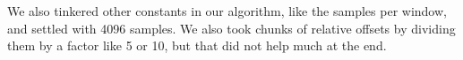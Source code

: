 \documentclass[12pt, a4paper]{IEEEtran}
\begin{document}
\par
We also tinkered other constants in our algorithm, like the samples per window, and settled with 4096 samples. We also took chunks of relative offsets by dividing them by a factor like 5 or 10, but that did not help much at the end.

\pagebreak

\onecolumn
\inputminted{python}{song.py}

    
    

                
                
    

\end{document}
